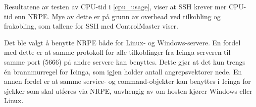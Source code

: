Resultatene av testen av CPU-tid i \ref{cpu_usage}, viser at SSH krever mer CPU-tid enn NRPE. Mye av dette er på grunn av overhead ved tilkobling og frakobling, som tallene for SSH med ControlMaster viser. 

Det ble valgt å benytte NRPE både for Linux- og Windows-servere. En fordel med dette er at samme protokoll for alle tilkoblinger fra Icinga-serveren til samme port (5666) på andre servere kan benyttes. Dette gjør at det kun trengs én brannmurregel for Icinga, som igjen holder antall angrepsvektorer nede. En annen fordel er at samme service- og command-objekter kan benyttes i Icinga for sjekker som skal utføres via NRPE, uavhengig av om hosten kjører Windows eller Linux.
